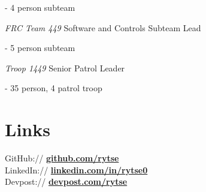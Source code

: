 \documentclass[]{deedy-resume-openfont}
\begin{document}
\begin{minipage}[t]{0.33\textwidth}
\indent - 4 person subteam

\vspace{0.125cm}

\textit{FRC Team 449} Software and Controls Subteam Lead

\indent - 5 person subteam

\vspace{0.125cm}

\textit{Troop 1449} Senior Patrol Leader

\indent - 35 person, 4 patrol troop

\sectionsep
\section{Links} 

\vspace{0.125cm}

GitHub:// \href{https://github.com/rytse}{\bf github.com/rytse} \\
LinkedIn://  \href{https://www.linkedin.com/in/rytse0}{\bf linkedin.com/in/rytse0} \\
Devpost:// \href{https://devpost.com/rytse}{\bf devpost.com/rytse} \\

\end{minipage} 
\hfill
\end{document}
